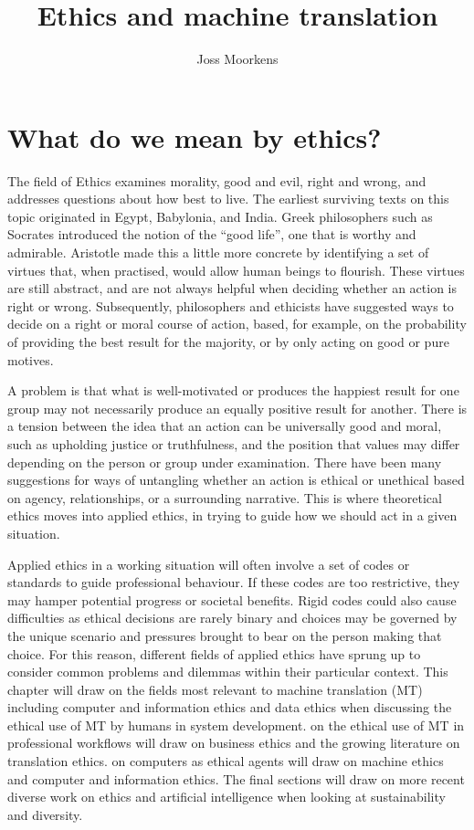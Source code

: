 \documentclass[output=paper]{langscibook}
\author{Joss Moorkens\affiliation{Dublin City University}}
\title{Ethics and machine translation}
\begin{document}
\maketitle


\section{What do we mean by ethics?}\label{sec:moorkens:1}

The field of Ethics examines morality, good and evil, right and wrong, and addresses questions about how best to live. The earliest surviving texts on this topic originated in Egypt, Babylonia, and India. Greek philosophers such as Socrates introduced the notion of the “good life”, one that is worthy and admirable. Aristotle made this a little more concrete by identifying a set of virtues that, when practised, would allow human beings to flourish. These virtues are still abstract, and are not always helpful when deciding whether an action is right or wrong. Subsequently, philosophers and ethicists have suggested ways to decide on a right or moral course of action, based, for example, on the probability of providing the best result for the majority, or by only acting on good or pure motives.

A problem is that what is well-motivated or produces the happiest result for one group may not necessarily produce an equally positive result for another. There is a tension between the idea that an action can be universally good and moral, such as upholding justice or truthfulness, and the position that values may differ depending on the person or group under examination. There have been many suggestions for ways of untangling whether an action is ethical or unethical based on agency, relationships, or a surrounding narrative. This is where theoretical ethics moves into applied ethics, in trying to guide how we should act in a given situation.

Applied ethics in a working situation will often involve a set of codes or standards to guide professional behaviour. If these codes are too restrictive, they may hamper potential progress or societal benefits. Rigid codes could also cause difficulties as ethical decisions are rarely binary and choices may be governed by the unique scenario and pressures brought to bear on the person making that choice. For this reason, different fields of applied ethics have sprung up to consider common problems and dilemmas within their particular context. This chapter will draw on the fields most relevant to machine translation (MT) including computer and information ethics and data ethics when discussing the ethical use of MT by humans in system development.  on the ethical use of MT in professional workflows will draw on business ethics and the growing literature on translation ethics.  on computers as ethical agents will draw on machine ethics and computer and information ethics. The final sections will draw on more recent diverse work on ethics and artificial intelligence when looking at sustainability and diversity.
\end{document}
